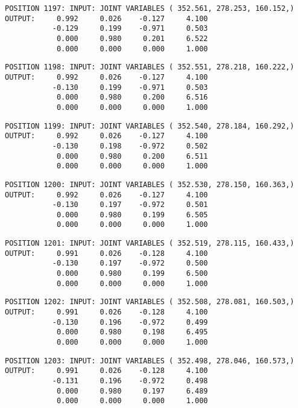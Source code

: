 \begin{verbatim}
POSITION 1197: INPUT: JOINT VARIABLES ( 352.561, 278.253, 160.152,)
OUTPUT:     0.992     0.026    -0.127     4.100
           -0.129     0.199    -0.971     0.503
            0.000     0.980     0.201     6.522
            0.000     0.000     0.000     1.000
\end{verbatim} \pagebreak[1]\begin{verbatim}
POSITION 1198: INPUT: JOINT VARIABLES ( 352.551, 278.218, 160.222,)
OUTPUT:     0.992     0.026    -0.127     4.100
           -0.130     0.199    -0.971     0.503
            0.000     0.980     0.200     6.516
            0.000     0.000     0.000     1.000
\end{verbatim} \pagebreak[1]\begin{verbatim}
POSITION 1199: INPUT: JOINT VARIABLES ( 352.540, 278.184, 160.292,)
OUTPUT:     0.992     0.026    -0.127     4.100
           -0.130     0.198    -0.972     0.502
            0.000     0.980     0.200     6.511
            0.000     0.000     0.000     1.000
\end{verbatim} \pagebreak[1]\begin{verbatim}
POSITION 1200: INPUT: JOINT VARIABLES ( 352.530, 278.150, 160.363,)
OUTPUT:     0.992     0.026    -0.127     4.100
           -0.130     0.197    -0.972     0.501
            0.000     0.980     0.199     6.505
            0.000     0.000     0.000     1.000
\end{verbatim} \pagebreak[1]\begin{verbatim}
POSITION 1201: INPUT: JOINT VARIABLES ( 352.519, 278.115, 160.433,)
OUTPUT:     0.991     0.026    -0.128     4.100
           -0.130     0.197    -0.972     0.500
            0.000     0.980     0.199     6.500
            0.000     0.000     0.000     1.000
\end{verbatim} \pagebreak[1]\begin{verbatim}
POSITION 1202: INPUT: JOINT VARIABLES ( 352.508, 278.081, 160.503,)
OUTPUT:     0.991     0.026    -0.128     4.100
           -0.130     0.196    -0.972     0.499
            0.000     0.980     0.198     6.495
            0.000     0.000     0.000     1.000
\end{verbatim} \pagebreak[1]\begin{verbatim}
POSITION 1203: INPUT: JOINT VARIABLES ( 352.498, 278.046, 160.573,)
OUTPUT:     0.991     0.026    -0.128     4.100
           -0.131     0.196    -0.972     0.498
            0.000     0.980     0.197     6.489
            0.000     0.000     0.000     1.000
\end{verbatim} \pagebreak[1]\begin{verbatim}

\end{verbatim}
